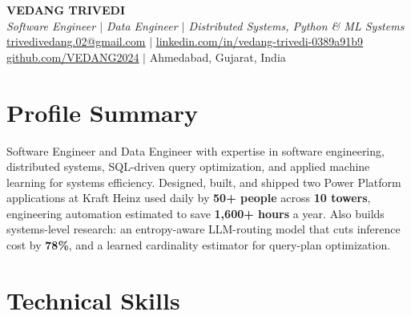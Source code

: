 \documentclass[letterpaper,10pt]{article}
\begin{document}
\begin{center}
    \textbf{\large VEDANG TRIVEDI} \\[0.15em]
    \textit{\footnotesize Software Engineer $\vert$ Data Engineer $\vert$ Distributed Systems, Python \& ML Systems} \\[0.15em]
    \href{mailto:trivedivedang.02@gmail.com}{\underline{\footnotesize trivedivedang.02@gmail.com}} \quad $|$ \quad
    \href{https://www.linkedin.com/in/vedang-trivedi-0389a91b9}{\underline{\footnotesize linkedin.com/in/vedang-trivedi-0389a91b9}} \\[0.15em]
    \href{https://www.github.com/VEDANG2024}{\underline{\footnotesize github.com/VEDANG2024}} \quad $|$ \quad
    \footnotesize Ahmedabad, Gujarat, India
\end{center}
\vspace{-0.3em}

\section{Profile Summary}
\vspace{-2pt}
\footnotesize
Software Engineer and Data Engineer with expertise in software engineering, distributed systems, SQL-driven query optimization, and applied machine learning for systems efficiency. Designed, built, and shipped two Power Platform applications at Kraft Heinz used daily by \textbf{50+ people} across \textbf{10 towers}, engineering automation estimated to save \textbf{1,600+ hours} a year. Also builds systems-level research: an entropy-aware LLM-routing model that cuts inference cost by \textbf{78\%}, and a learned cardinality estimator for query-plan optimization.
\normalsize

\vspace{-0.55em}
\section{Technical Skills}

\vspace{-0.55em}
\end{document}

